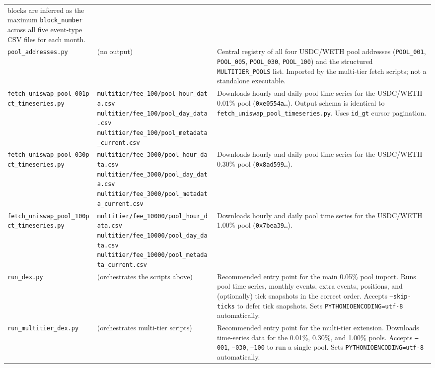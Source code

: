 \documentclass[11pt,a4paper]{article}
\begin{document}
\begin{xltabular}{\linewidth}{L{4.5cm}L{4.0cm}Y}
    blocks are inferred as the maximum \texttt{block\_number} across all
    five event-type CSV files for each month. \\
\addlinespace
\texttt{pool\_addresses.py}
  & (no output)
  & Central registry of all four USDC/WETH pool addresses
    (\texttt{POOL\_001}, \texttt{POOL\_005}, \texttt{POOL\_030},
    \texttt{POOL\_100}) and the structured \texttt{MULTITIER\_POOLS} list.
    Imported by the multi-tier fetch scripts; not a standalone executable. \\
\addlinespace
\texttt{fetch\_uniswap\_pool\_001pct\_timeseries.py}
  & \texttt{multitier/fee\_100/pool\_hour\_data.csv} \newline
    \texttt{multitier/fee\_100/pool\_day\_data.csv} \newline
    \texttt{multitier/fee\_100/pool\_metadata\_current.csv}
  & Downloads hourly and daily pool time series for the USDC/WETH 0.01\%
    pool (\texttt{0xe0554a\ldots}). Output schema is identical to
    \texttt{fetch\_uniswap\_pool\_timeseries.py}. Uses
    \texttt{id\_gt} cursor pagination. \\
\addlinespace
\texttt{fetch\_uniswap\_pool\_030pct\_timeseries.py}
  & \texttt{multitier/fee\_3000/pool\_hour\_data.csv} \newline
    \texttt{multitier/fee\_3000/pool\_day\_data.csv} \newline
    \texttt{multitier/fee\_3000/pool\_metadata\_current.csv}
  & Downloads hourly and daily pool time series for the USDC/WETH 0.30\%
    pool (\texttt{0x8ad599\ldots}). \\
\addlinespace
\texttt{fetch\_uniswap\_pool\_100pct\_timeseries.py}
  & \texttt{multitier/fee\_10000/pool\_hour\_data.csv} \newline
    \texttt{multitier/fee\_10000/pool\_day\_data.csv} \newline
    \texttt{multitier/fee\_10000/pool\_metadata\_current.csv}
  & Downloads hourly and daily pool time series for the USDC/WETH 1.00\%
    pool (\texttt{0x7bea39\ldots}). \\
\addlinespace
\texttt{run\_dex.py}
  & (orchestrates the scripts above)
  & Recommended entry point for the main 0.05\% pool import.
    Runs pool time series, monthly events, extra events, positions, and
    (optionally) tick snapshots in the correct order.
    Accepts \texttt{--skip-ticks} to defer tick snapshots. Sets
    \texttt{PYTHONIOENCODING=utf-8} automatically. \\
\addlinespace
\texttt{run\_multitier\_dex.py}
  & (orchestrates multi-tier scripts)
  & Recommended entry point for the multi-tier extension. Downloads
    time-series data for the 0.01\%, 0.30\%, and 1.00\% pools.
    Accepts \texttt{--001}, \texttt{--030}, \texttt{--100} to run
    a single pool. Sets \texttt{PYTHONIOENCODING=utf-8} automatically. \\
\bottomrule
\end{xltabular}
\end{document}
